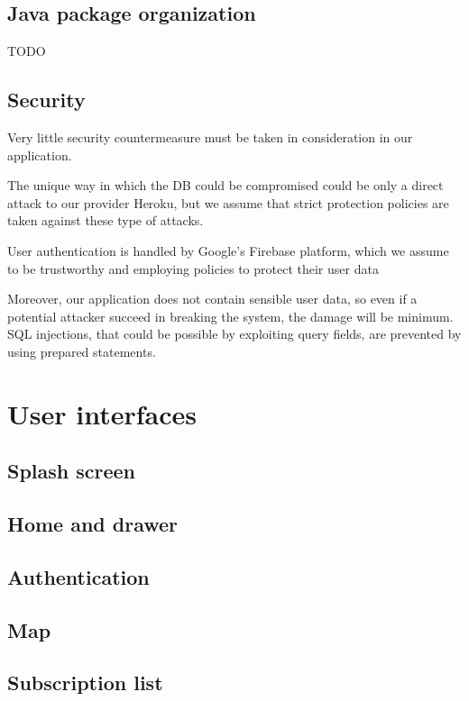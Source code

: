 \documentclass[a4paper]{scrreprt}
\begin{document}
\section{Java package organization}
TODO

\section{Security}
Very little security countermeasure must be taken in consideration in our application.
\par The unique way in which the DB could be compromised could be only a direct attack to our provider Heroku, but we assume that strict protection policies are taken against these type of attacks.
\par User authentication is handled by Google's Firebase platform, which we assume to be trustworthy and employing policies to protect their user data
\par Moreover, our application does not contain sensible user data, so even if a potential attacker succeed in breaking the system, the damage will be minimum. SQL injections, that could be possible by exploiting query fields, are prevented by using prepared statements.



\chapter{User interfaces}

\section{Splash screen}

\section{Home and drawer}

\section{Authentication}

\section{Map}

\section{Subscription list}
\end{document}
